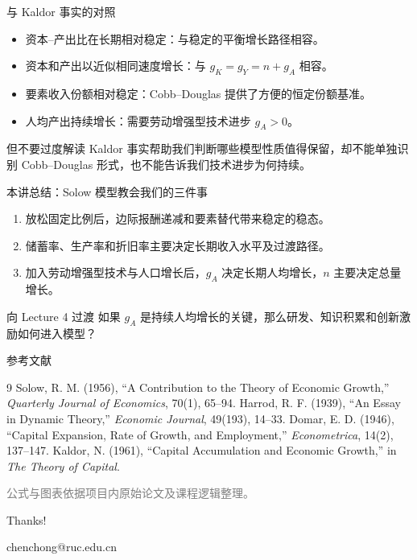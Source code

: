 \documentclass[aspectratio=32]{beamer}
\begin{document}
\begin{frame}{与 Kaldor 事实的对照}
\small
\raggedright
\begin{itemize}
  \item 资本--产出比在长期相对稳定：与稳定的平衡增长路径相容。
  \item 资本和产出以近似相同速度增长：与 $g_K=g_Y=n+g_A$ 相容。
  \item 要素收入份额相对稳定：Cobb--Douglas 提供了方便的恒定份额基准。
  \item 人均产出持续增长：需要劳动增强型技术进步 $g_A>0$。
\end{itemize}
\vspace{0.2cm}
\begin{block}{但不要过度解读}
Kaldor 事实帮助我们判断哪些模型性质值得保留，却不能单独识别 Cobb--Douglas 形式，也不能告诉我们技术进步为何持续。
\end{block}
\end{frame}

\begin{frame}{本讲总结：Solow 模型教会我们的三件事}
\small
\begin{enumerate}
  \item 放松固定比例后，边际报酬递减和要素替代带来稳定的稳态。
  \item 储蓄率、生产率和折旧率主要决定长期收入水平及过渡路径。
  \item 加入劳动增强型技术与人口增长后，$g_A$ 决定长期人均增长，$n$ 主要决定总量增长。
\end{enumerate}
\vspace{0.2cm}
\begin{alertblock}{向 Lecture 4 过渡}
如果 $g_A$ 是持续人均增长的关键，那么研发、知识积累和创新激励如何进入模型？
\end{alertblock}
\end{frame}

\begin{frame}{参考文献}
\small
\begin{thebibliography}{9}
 Solow, R. M. (1956), ``A Contribution to the Theory of Economic Growth,'' \emph{Quarterly Journal of Economics}, 70(1), 65--94.
 Harrod, R. F. (1939), ``An Essay in Dynamic Theory,'' \emph{Economic Journal}, 49(193), 14--33.
 Domar, E. D. (1946), ``Capital Expansion, Rate of Growth, and Employment,'' \emph{Econometrica}, 14(2), 137--147.
 Kaldor, N. (1961), ``Capital Accumulation and Economic Growth,'' in \emph{The Theory of Capital}.
\end{thebibliography}
\vfill
\begin{center}
\textcolor{gray}{公式与图表依据项目内原始论文及课程逻辑整理。}
\end{center}
\end{frame}

\begin{frame}[plain]
\begin{center}
\vfill
{\color{LectureBlue}\Huge Thanks!}\par
\vspace{0.35cm}
\large chenchong@ruc.edu.cn
\vfill
\end{center}
\end{frame}
\end{document}
